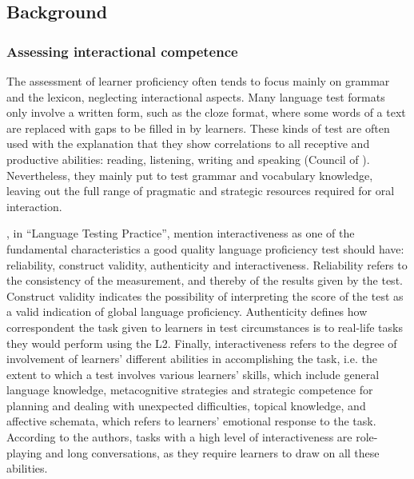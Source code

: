 \subsection{Background}
\hypertarget{Toc191305924}{}\subsubsection{Assessing interactional competence}
\hypertarget{Toc191305925}{}
The assessment of learner proficiency often tends to focus mainly on grammar and the lexicon, neglecting interactional aspects. Many language test formats only involve a written form, such as the cloze format, where some words of a text are replaced with gaps to be filled in by learners. These kinds of test are often used with the explanation that they show correlations to all receptive and productive abilities: reading, listening, writing and speaking (Council of \citealt{Europe2001}). Nevertheless, they mainly put to test grammar and vocabulary knowledge, leaving out the full range of pragmatic and strategic resources required for oral interaction.

\citet{BachmanPalmer1996}, in “Language Testing Practice”, mention interactiveness as one of the fundamental characteristics a good quality language proficiency test should have: reliability, construct validity, authenticity and interactiveness. Reliability refers to the consistency of the measurement, and thereby of the results given by the test. Construct validity indicates the possibility of interpreting the score of the test as a valid indication of global language proficiency. Authenticity defines how correspondent the task given to learners in test circumstances is to real-life tasks they would perform using the L2. Finally, interactiveness refers to the degree of involvement of learners’ different abilities in accomplishing the task, i.e. the extent to which a test involves various learners’ skills, which include general language knowledge, metacognitive strategies and strategic competence for planning and dealing with unexpected difficulties, topical knowledge, and affective schemata, which refers to learners’ emotional response to the task. According to the authors, tasks with a high level of interactiveness are role-playing and long conversations, as they require learners to draw on all these abilities.


